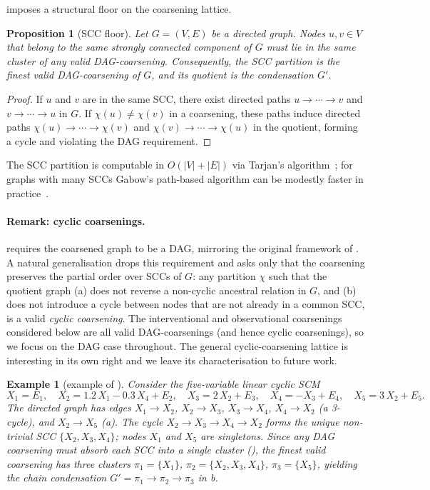 \documentclass{article}
\newtheorem{proposition}{Proposition}
\newtheorem{example}{Example}
\begin{document}
 imposes a structural floor on the coarsening lattice.

\begin{proposition}[SCC floor]\label{prop:scc-floor}
    Let $G = (V, E)$ be a directed graph. Nodes $u, v \in V$ that belong to the same strongly connected component of $G$ must lie in the same cluster of any valid DAG-coarsening. Consequently, the SCC partition is the finest valid DAG-coarsening of $G$, and its quotient is the condensation $G'$.
\end{proposition}

\begin{proof}
    If $u$ and $v$ are in the same SCC, there exist directed paths $u \to \cdots \to v$ and $v \to \cdots \to u$ in $G$. If $\chi(u) \neq \chi(v)$ in a coarsening, these paths induce directed paths $\chi(u) \to \cdots \to \chi(v)$ and $\chi(v) \to \cdots \to \chi(u)$ in the quotient, forming a cycle and violating the DAG requirement.
\end{proof}

The SCC partition is computable in $O(|V| + |E|)$ via Tarjan's algorithm~\citep{tarjan1972depth}; for graphs with many SCCs Gabow's path-based algorithm can be modestly faster in practice~\citep{gabow2000path}.

\paragraph{Remark: cyclic coarsenings.}
 requires the coarsened graph to be a DAG, mirroring the original framework of \citet{madaleno2026coarsening}. A natural generalisation drops this requirement and asks only that the coarsening preserves the partial order over SCCs of $G$: any partition $\chi$ such that the quotient graph (a) does not reverse a non-cyclic ancestral relation in $G$, and (b) does not introduce a cycle between nodes that are not already in a common SCC, is a valid \emph{cyclic coarsening}. The interventional and observational coarsenings considered below are all valid DAG-coarsenings (and hence cyclic coarsenings), so we focus on the DAG case throughout. The general cyclic-coarsening lattice is interesting in its own right and we leave its characterisation to future work.

\begin{example}[example of \citet{lacerda2008discovering}]\label{ex:illustrative}
Consider the five-variable linear cyclic SCM
\[
    X_1 = E_1,\quad
    X_2 = 1.2\,X_1 - 0.3\,X_4 + E_2,\quad
    X_3 = 2\,X_2 + E_3,\quad
    X_4 = -X_3 + E_4,\quad
    X_5 = 3\,X_2 + E_5.
\]
The directed graph has edges $X_1\!\to\!X_2$, $X_2\!\to\!X_3$, $X_3\!\to\!X_4$, $X_4\!\to\!X_2$ (a 3-cycle), and $X_2\!\to\!X_5$ (a). The cycle $X_2\!\to\!X_3\!\to\!X_4\!\to\!X_2$ forms the unique non-trivial SCC $\{X_2,X_3,X_4\}$; nodes $X_1$ and $X_5$ are singletons. Since any DAG coarsening must absorb each SCC into a single cluster (), the finest valid coarsening has three clusters $\pi_1=\{X_1\}$, $\pi_2=\{X_2,X_3,X_4\}$, $\pi_3=\{X_5\}$, yielding the chain condensation $G' = \pi_1\to\pi_2\to\pi_3$ in b.
\end{example}
\end{document}
